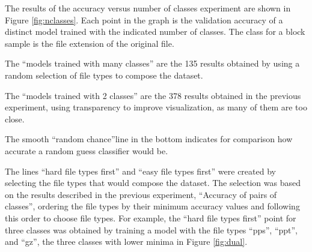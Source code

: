 The results of the accuracy versus number of classes experiment are shown in Figure \ref{fig:nclasses}.  Each point in the graph is the validation accuracy of a distinct model trained with the indicated number of classes. The class for a block sample is the file extension of the original file. 

The ``models trained with many classes'' are the 135 results obtained by using a random selection of file types to compose the dataset.

The ``models trained with 2 classes'' are the 378 results obtained in the previous experiment, using transparency to improve visualization, as many of them are too close. 

The smooth ``random chance''line in the bottom indicates for comparison how accurate a random guess classifier would be.


The lines ``hard file types first'' and ``easy file types first'' were created by selecting the file types that would compose the dataset. The selection was based on the results described in the previous experiment, ``Accuracy of pairs of classes'', ordering the file types by their minimum accuracy values and following this order to choose file types. For example, the ``hard file types first'' point for three classes was obtained by training a model with the file types ``pps'', ``ppt'', and ``gz'', the three classes with lower minima in Figure \ref{fig:dual}.

